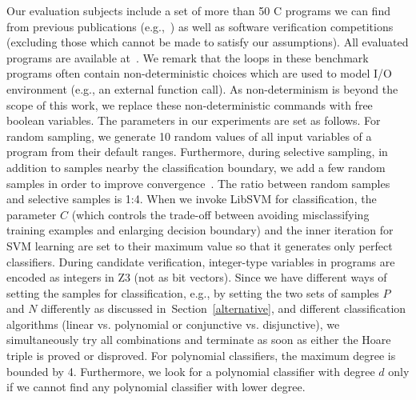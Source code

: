 Our evaluation subjects include a set of more than 50 C programs we can find from previous publications (e.g.,~\cite{DBLP:conf/pldi/GulwaniSV08,sharma2012interpolants,gulavani2008automatically,jeannet2010interproc,isil2013inductive}) as well as software verification competitions~\cite{Dirk:SVCOMP:2016} %
 (excluding those which cannot be made to satisfy our assumptions). All evaluated programs are available at~\cite{zilu:repo}. We remark that the loops in these benchmark programs often contain non-deterministic choices which are used to model I/O environment (e.g., an external function call). As non-determinism is beyond the scope of this work, we replace these non-deterministic commands with free boolean variables. The parameters in our experiments are set as follows. For random sampling, we generate 10 random values of all input variables of a program from their default ranges. Furthermore, during selective sampling, in addition to samples nearby the classification boundary, we add a few random samples in order to improve convergence~\cite{DBLP:conf/icml/SchohnC00}. The ratio between random samples and selective samples is 1:4. When we invoke LibSVM for classification, the parameter $C$ (which controls the trade-off between avoiding misclassifying training examples and enlarging decision boundary) and the inner iteration for SVM learning are set to their maximum value so that it generates only perfect classifiers. During candidate verification, integer-type variables in programs are encoded as integers in Z3 (not as bit vectors). Since we have different ways of setting the samples for classification, e.g., by setting the two sets of samples $P$ and $N$ differently as discussed in~Section~\ref{alternative}, and different classification algorithms (linear vs. polynomial or conjunctive vs. disjunctive), we simultaneously try all combinations and terminate as soon as either the Hoare triple is proved or disproved. For polynomial classifiers, the maximum degree is bounded by 4. Furthermore, we look for a polynomial classifier with degree $d$ only if we cannot find any polynomial classifier with lower degree.



